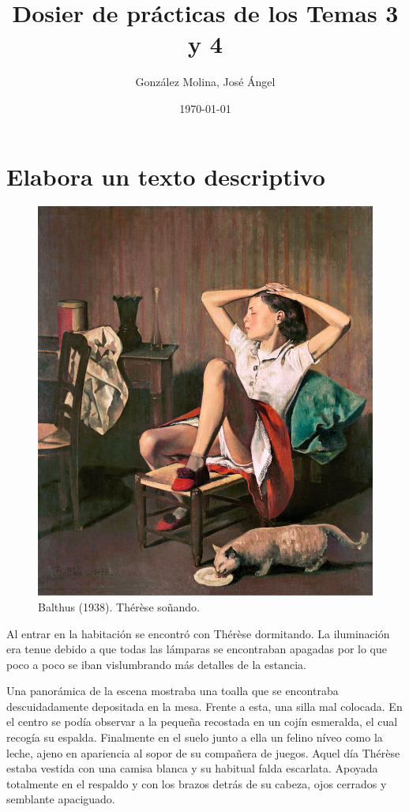 \documentclass[12pt, a4paper, oneside]{report}
\title{Dosier de prácticas de los Temas 3 y 4}
\author{González Molina, José Ángel}
\date{\today}
\begin{document}
    \color{negro}
    \maketitle
    \clearpage

    \renewcommand{\chaptername}{Ejercicio}
    \renewcommand{\figurename}{Fig.}
    \chapter{Elabora un texto descriptivo}
        \begin{figure}[ht]
            \centering
            \includegraphics[scale = .75]{balthus}
            \caption{Balthus (1938). Thérèse soñando.}
        \end{figure}
        Al entrar en la habitación se encontró con Thérèse dormitando. La iluminación era tenue debido a que
        todas las lámparas se encontraban apagadas por lo que poco a poco se iban vislumbrando más detalles de
        la estancia.

        Una panorámica de la escena mostraba una toalla que se encontraba descuidadamente depositada en la
        mesa. Frente a esta, una silla mal colocada. En el centro se podía observar a la pequeña recostada en
        un cojín esmeralda, el cual recogía su espalda. Finalmente en el suelo junto a ella un felino níveo
        como la leche, ajeno en apariencia al sopor de su compañera de juegos. Aquel día Thérèse estaba
        vestida con una camisa blanca y su habitual falda escarlata. Apoyada totalmente en el respaldo y con
        los brazos detrás de su cabeza, ojos cerrados y semblante apaciguado.
\end{document}
